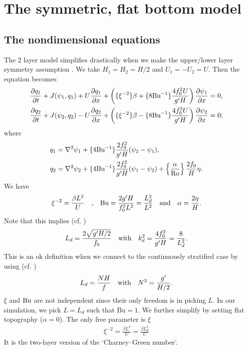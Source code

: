 \section{The symmetric, flat bottom model}
\subsection{The nondimensional equations}
The 2 layer model simplifies drastically when we make the upper/lower layer symmetry assumption \parencite{LarichevHeld_95}. We take $H_1=H_2 = H/2$ and $U_1=-U_2=U$. Then the equation becomes
\begin{align}
    &\frac{\partial q_1}{\partial t}+J(\psi_1,q_1)+U\frac{\partial q_1}{\partial x}+\left(\{\xi^{-2}\}\beta+\{8\text{Bu}^{-1}\}\frac{4f_0^2U}{g'H}\right)\frac{\partial\psi_1}{\partial x} = 0,\label{eq:2lay_sym_eq1}\\
    &\frac{\partial q_2}{\partial t}+J(\psi_2,q_2)-U\frac{\partial q_2}{\partial x}+\left(\{\xi^{-2}\}\beta-\{8\text{Bu}^{-1}\}\frac{4f_0^2U}{g'H}\right)\frac{\partial\psi_2}{\partial x} = 0;\label{eq:2lay_sym_eq2}
\end{align}
where
\begin{align}
    q_1 &= \nabla^2\psi_1 + \{4\text{Bu}^{-1}\}\frac{2f_0^2}{g'H}(\psi_2-\psi_1),\label{eq:2lay_sym_pv1}\\
    q_2 &= \nabla^2\psi_2 + \{4\text{Bu}^{-1}\}\frac{2f_0^2}{g'H}(\psi_1-\psi_2)+\left\{\frac{\alpha}{\text{Ro}}\right\}\frac{2f_0}{H}\eta.\label{eq:2lay_sym_pv2}
\end{align}
We have 
\begin{align}
    \xi^{-2} = \frac{\beta L^2}{U} \quad \mbox{,} \quad \text{Bu} = \frac{2g'H}{f_0^2L^2} = \frac{L_{d}^2}{L^2} \quad \mbox{and} \quad \alpha = \frac{2\eta}{H}.
\end{align}
Note that this implies (cf. \cite[(9.103)]{Vallis_17})
\begin{align}
    L_d = \frac{2\sqrt{g'H/2}}{f_0} \quad \mbox{with} \quad k_d^2 = \frac{4f_0^2}{g'H} = \frac{8}{L_d^2}.
\end{align}
This is an ok definition when we connect to the continuously stratified case by using (cf. \cite[(5.138)]{Vallis_17})
\begin{align}
    L_d = \frac{NH}{f} \quad \mbox{with} \quad N^2 = \frac{g'}{H/2}.
\end{align}
$\xi$ and $\text{Bu}$ are not independent since their only freedom is in picking $L$. In our simulation, we pick $L=L_d$ such that $\text{Bu}=1$. 
We further simplify by setting flat topography ($\alpha=0$). The only free parameter is $\xi$
\begin{align}
    \xi^{-2}= \frac{\beta L^2}{U} = \frac{\beta L_d^2}{U}
\end{align}
It is the two-layer version of the `Charney–Green number’. 

